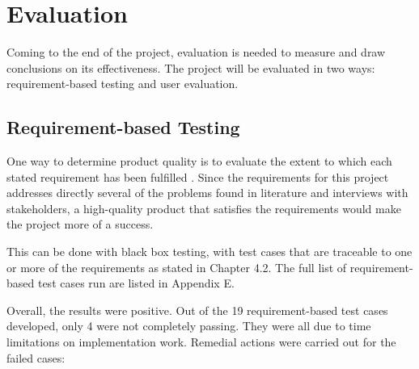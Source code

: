 \chapter{Evaluation}

Coming to the end of the project, evaluation is needed to measure and draw conclusions
on its effectiveness. The project will be evaluated in two ways:
requirement-based testing and user evaluation.

\section{Requirement-based Testing}

One way to determine product quality is to evaluate the extent to which each stated requirement
has been fulfilled \citep{bach1999risk}. Since the requirements for this project addresses directly
several of the problems found in literature and interviews with stakeholders, a high-quality product
that satisfies the requirements would make the project more of a success.

This can be done with black box testing, with test cases that are traceable to one or more of
the requirements as stated in Chapter 4.2.
The full list of requirement-based test cases run are listed in Appendix E.

Overall, the results were positive.
Out of the 19 requirement-based test cases developed, only 4 were not completely passing.
They were all due to time limitations on implementation work.
Remedial actions were carried out for the failed cases:


